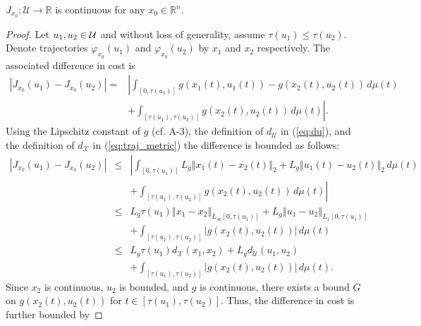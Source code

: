 \documentclass{llncs}
\begin{document}
\begin{lemma} \label{lem:cost_cont}
%
$J_{x_0}:\mathcal{U}\rightarrow\mathbb{R}$ is continuous for any $x_0\in \mathbb{R}^n$.
%
\end{lemma}
%
\begin{proof}
Let $u_{1},u_{2}\in\mbox{\ensuremath{\mathcal{U}}}$ and without
loss of generality, assume $\tau(u_{1})\leq\tau(u_{2})$. Denote
trajectories $\varphi_{x_{0}}(u_{1})$ and $\varphi_{x_{0}}(u_{2})$ by
$x_{1}$ and $x_{2}$ respectively. The associated difference in cost is 
\begin{equation}
\begin{array}{rl}
\left|J_{x_0}(u_{1})-J_{x_0}(u_{2})\right|= & \left|\int_{\left[0,\tau(u_{1})\right]}g\left(x_{1}(t),u_{1}(t)\right)\right.-g\left(x_{2}(t),u_{2}(t)\right)\, d\mu(t)\\
 & +\left.\int_{\left[\tau(u_{1}),\tau(u_{2})\right]}g\left(x_{2}(t),u_{2}(t)\right)\, d\mu(t)\right|.
\end{array}
\end{equation}
Using the Lipschitz constant of $g$ (cf. A-3), the definition of $d_{\mathcal{U} }$ in (\ref{eq:du}), and the definition of $d_{\mathcal{X} }$ in (\ref{eq:traj_metric}) the difference is bounded as follows: 
\begin{equation}
\begin{array}{rcl}
\left|J_{x_0}(u_{1})-J_{x_0}(u_{2})\right| & \leq & \left|\int_{\left[0,\tau(u_{1})\right]} L_{g}\left\Vert x_{1}(t)-x_{2}(t)\right\Vert _{2}\right.+L_{g}\left\Vert u_{1}(t)-u_{2}(t)\right\Vert _{2}\, d\mu(t) \\
 &  & +\left.\int_{\left[\tau(u_{1}),\tau(u_{2})\right]}g\left(x_{2}(t),u_{2}(t)\right)\, d\mu(t)\right|\\
 & \leq & L_{g}\tau(u_{1})\left\Vert x_{1}-x_{2}\right\Vert _{L_{\infty}\left[0,\tau(u_{1})\right]}+L_{g}\left\Vert u_{1}-u_{2}\right\Vert _{L_{1}\left[0,\tau(u_{1})\right]}\\
 &  & +\int_{\left[\tau(u_{1}),\tau(u_{2})\right]}\left|g\left(x_{2}(t),u_{2}(t)\right)\right|\, d\mu(t)\\
 & \leq & L_{g}\tau(u_{1}) d_{\mathcal{X}}(x_1,x_2)+ L_{g}d_{\mathcal{U}}(u_1,u_2)\\ 
& &  +\int_{\left[\tau(u_{1}),\tau(u_{2})\right]}\left|g\left(x_{2}(t),u_{2}(t)\right)\right|\, d\mu(t). 
\end{array}\label{eq:cost_diff}
\end{equation}
Since $x_2$ is continuous, $u_2$ is bounded, and $g$ is continuous, there exists a bound $G$ on $g(x_2(t),u_2(t))$ for $t\in [\tau(u_1),\tau(u_2)]$. Thus, the difference in cost is further bounded by  


\end{proof}
\end{document}
